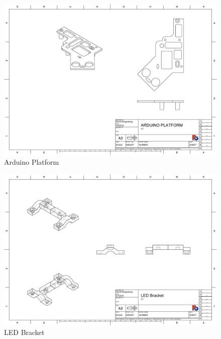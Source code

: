\documentclass[pdftex,11pt]{article}
\begin{document}
\begin{figure}[!h]
	\centering
		\includegraphics[width=1\textwidth]{./graphics/arduino_platformv7-eps-converted-to.pdf}
	\caption{Arduino Platform}
	\label{fig:arduinoplatform}
\end{figure}

\begin{figure}[!h]
	\centering
		\includegraphics[width=1\textwidth]{./graphics/LED_Bracket-eps-converted-to.pdf}
	\caption{LED Bracket}
	\label{fig:arduinoplatform}
\end{figure}
\end{document}
